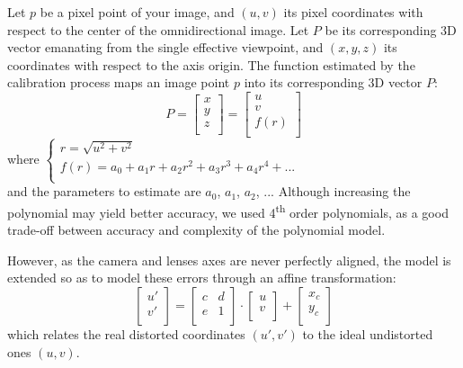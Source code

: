 Let $p$ be a pixel point of your image, and $(u,v)$ its pixel coordinates with respect to the center of the omnidirectional image. Let $P$ be its corresponding 3D vector emanating from the single effective viewpoint, and $(x,y,z)$ its coordinates with respect to the axis origin. The function estimated by the calibration process maps an image point $p$ into its corresponding 3D vector $P$:\\
\begin{equation}
\label{equ:cameraModel1}
P = \begin{bmatrix}
		x\\
		y\\
		z\\
	\end{bmatrix}
	= \begin{bmatrix}
		u\\
		v\\
		f(r)\\
	  \end{bmatrix}
\end{equation}
where 
$
\begin{cases}
r = \sqrt{u^2 + v^2}\\
f(r)= a_0 + a_1r + a_2r^2 + a_3r^3 + a_4r^4 + ...\\
\end{cases}
$\\
and the parameters to estimate are $a_0$, $a_1$, $a_2$, ...
Although increasing the polynomial may yield better accuracy, we used 4\textsuperscript{th} order polynomials, as a good trade-off between accuracy and complexity of the polynomial model.

However, as the camera and lenses axes are never perfectly aligned, the model is extended so as to model these errors through an affine transformation:
\begin{equation}
\label{equ:cameraModel2}
\begin{bmatrix}
u'\\
v'\\
\end{bmatrix}
=
\begin{bmatrix}
c & d\\
e & 1\\
\end{bmatrix}
\cdot
\begin{bmatrix}
u\\
v\\
\end{bmatrix}
+
\begin{bmatrix}
x_c\\
y_c\\
\end{bmatrix}
\end{equation}
which relates the real distorted coordinates $(u', v')$ to the ideal undistorted ones $(u,v)$.

